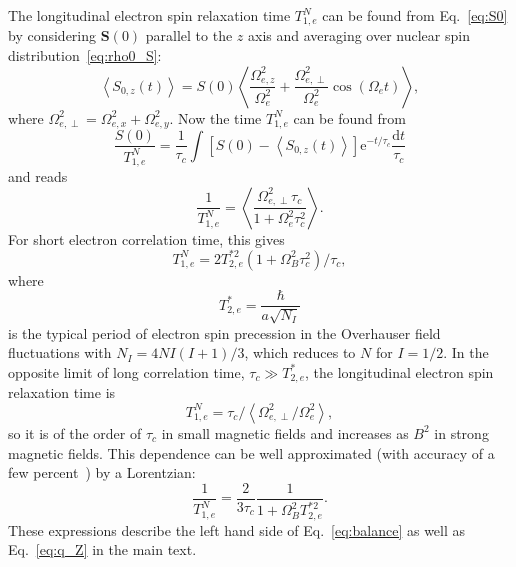 \documentclass[prl,nobibnotes,twocolumn,aps,longbibliography,superscriptaddress,notoc]{revtex4-1}
\newcommand{\e}{\mathrm{e}}
\renewcommand{\d}{\mathrm d}
\newcommand{\braket}[1]{\left\langle #1 \right\rangle}
\begin{document}
The longitudinal electron spin relaxation time $T_{1,e}^N$ can be found from Eq.~\eqref{eq:S0} by considering $\bm S(0)$ parallel to the $z$ axis and averaging over nuclear spin distribution~\eqref{eq:rho0_S}:
\begin{equation}
  \braket{S_{0,z}(t)}=S(0)\braket{\frac{\Omega_{e,z}^2}{\Omega_e^2}+\frac{\Omega_{e,\perp}^2}{\Omega_e^2}\cos\left(\Omega_et\right)},
\end{equation}
where $\Omega_{e,\perp}^2=\Omega_{e,x}^2+\Omega_{e,y}^2$. Now the time $T_{1,e}^N$ can be found from
\begin{equation}
  \label{eq:T1e_def}
  \frac{S(0)}{T_{1,e}^N}=\frac{1}{\tau_c}\int\left[S(0)-\braket{S_{0,z}(t)}\right]\e^{-t/\tau_c}\frac{\d t}{\tau_c}
\end{equation}
and reads~\cite{S_Glazov_hopping,S_PRC}
\begin{equation}
  \label{eq:T1e}
  \frac{1}{T_{1,e}^N}=\braket{\frac{\Omega_{e,\perp}^2\tau_c}{1+\Omega_e^2\tau_c^2}}.
\end{equation}
For short electron correlation time, this gives
\begin{equation}
  T_{1,e}^N=2T_{2,e}^{*2}(1+\Omega_B^2\tau_c^2)/\tau_c,
\end{equation}
where
\begin{equation}
  T_{2,e}^{*}=\frac{\hbar}{a\sqrt{N_I}}
\end{equation}
is the typical period of electron spin precession in the Overhauser field fluctuations with $N_I=4NI(I+1)/3$, which reduces to $N$ for $I=1/2$. In the opposite limit of long correlation time, $\tau_c\gg T_{2,e}^*$, the longitudinal electron spin relaxation time is
\begin{equation}
  T_{1,e}^N=\tau_c/\braket{\Omega_{e,\perp}^2/\Omega_e^2},
\end{equation}
so it is of the order of $\tau_c$ in small magnetic fields and increases as $B^2$ in strong magnetic fields. This dependence can be well approximated (with accuracy of a few percent~\cite{S_petrov08,S_book_Glazov}) by a Lorentzian:
\begin{equation}
  \frac{1}{T_{1,e}^N}=\frac{2}{3\tau_c}\frac{1}{1+\Omega_B^2T_{2,e}^{*2}}.
\end{equation}
These expressions describe the left hand side of Eq.~\eqref{eq:balance} as well as Eq.~\eqref{eq:q_Z} in the main text.
\end{document}
